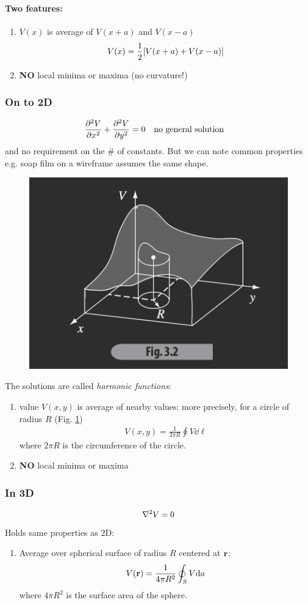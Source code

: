 \documentclass[../main.tex]{subfiles}
\begin{document}
\paragraph{Two features:}
\begin{enumerate}
    \item $V(x)$ is average of $V(x + a)$ and $V(x - a)$
    \begin{align*}
        V(x) = \frac{1}{2} \qt[V(x + a) + V(x - a)]
    \end{align*}
    \item \textbf{NO} local minima or maxima (no curvature!)
\end{enumerate}

\newpage
\subsubsection{On to 2D}
\begin{align*}
    \pdv[2]{V}{x} + \pdv[2]{V}{y} = 0 \qqtext{no general solution}
\end{align*}
and no requirement on the \# of constants.
But we can note common properties e.g. soap film on a wireframe assumes the same shape.
\begin{figure}[ht]
    \centering
    \includegraphics[width=0.3\linewidth]{fig3_2.png}
    \caption{}
    \label{fig:lecture3_2}
\end{figure}
The solutions are called \textit{harmonic functions}:
\begin{enumerate}
    \item value $V(x,y)$ is average of nearby values; more precisely, for a circle of radius $R$ (Fig. \ref{fig:lecture3_2})
    \begin{align*}
        V(x,y) = \frac{1}{2\pi R} \oint V \dd\ell
    \end{align*}
    where $2\pi R$ is the circumference of the circle.
    \item \textbf{NO} local minima or maxima
\end{enumerate}

\subsubsection{In 3D}
\begin{align*}
    \laplacian V = 0
\end{align*}
Holds same properties as 2D:
\begin{enumerate}
    \item Average over spherical surface of radius $R$ centered at $\vb r$:
    \begin{align*}
        V(\vb r) = \frac{1}{4\pi R^2} \oint_S V \dd a
    \end{align*}
    where $4\pi R^2$ is the surface area of the sphere.
\end{enumerate}
\end{document}
